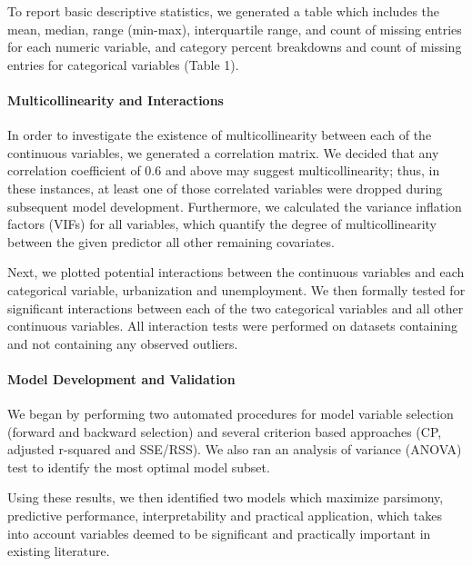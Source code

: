 \documentclass[
]{article}
\begin{document}
To report basic descriptive statistics, we generated a table which
includes the mean, median, range (min-max), interquartile range, and
count of missing entries for each numeric variable, and category percent
breakdowns and count of missing entries for categorical variables (Table
1).

\hypertarget{multicollinearity-and-interactions}{%
\paragraph{Multicollinearity and
Interactions}\label{multicollinearity-and-interactions}}

In order to investigate the existence of multicollinearity between each
of the continuous variables, we generated a correlation matrix. We
decided that any correlation coefficient of 0.6 and above may suggest
multicollinearity; thus, in these instances, at least one of those
correlated variables were dropped during subsequent model development.
Furthermore, we calculated the variance inflation factors (VIFs) for all
variables, which quantify the degree of multicollinearity between the
given predictor all other remaining covariates.

Next, we plotted potential interactions between the continuous variables
and each categorical variable, urbanization and unemployment. We then
formally tested for significant interactions between each of the two
categorical variables and all other continuous variables. All
interaction tests were performed on datasets containing and not
containing any observed outliers.

\hypertarget{model-development-and-validation}{%
\paragraph{Model Development and
Validation}\label{model-development-and-validation}}

We began by performing two automated procedures for model variable
selection (forward and backward selection) and several criterion based
approaches (CP, adjusted r-squared and SSE/RSS). We also ran an analysis
of variance (ANOVA) test to identify the most optimal model subset.

Using these results, we then identified two models which maximize
parsimony, predictive performance, interpretability and practical
application, which takes into account variables deemed to be significant
and practically important in existing literature.
\end{document}
